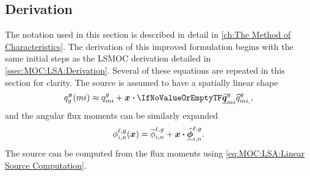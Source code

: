 {{    \subsection{Derivation}{\label{ssec:LSMOC:Derivation}
      The notation used in this section is described in detail in \cref{ch:The Method of Characteristics}.
      The derivation of this improved formulation begins with the same initial steps as the \ac{LSMOC} derivation detailed in \cref{ssec:MOC:LSA:Derivation}.
      Several of these equations are repeated in this section for clarity.
      The source is assumed to have a spatially linear shape
      \begin{equation}\label{eq:LSMOC:Source Shape}
        \source[mi][g][\loc] \approx \srcF[mi] + \loc\vdot\srcL[][mi],
      \end{equation}
      and the angular flux moments can be similarly expanded
      \begin{equation}\label{eq:LSMOC:Flux Expansion}
        \fluxA(\loc) = \fluxF + \loc\vdot\fluxL.
      \end{equation}
      The source can be computed from the flux moments using \cref{eq:MOC:LSA:Linear Source Computation}.

}}}
